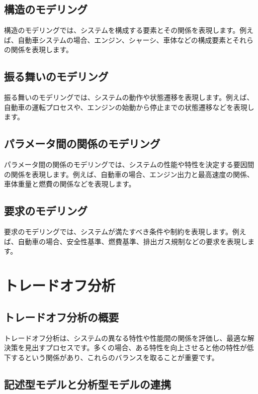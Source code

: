 \subsection{構造のモデリング}

構造のモデリングでは、システムを構成する要素とその関係を表現します。例えば、自動車システムの場合、エンジン、シャーシ、車体などの構成要素とそれらの関係を表現します。

\subsection{振る舞いのモデリング}

振る舞いのモデリングでは、システムの動作や状態遷移を表現します。例えば、自動車の運転プロセスや、エンジンの始動から停止までの状態遷移などを表現します。

\subsection{パラメータ間の関係のモデリング}

パラメータ間の関係のモデリングでは、システムの性能や特性を決定する要因間の関係を表現します。例えば、自動車の場合、エンジン出力と最高速度の関係、車体重量と燃費の関係などを表現します。

\subsection{要求のモデリング}

要求のモデリングでは、システムが満たすべき条件や制約を表現します。例えば、自動車の場合、安全性基準、燃費基準、排出ガス規制などの要求を表現します。

\section{トレードオフ分析}

\subsection{トレードオフ分析の概要}

トレードオフ分析は、システムの異なる特性や性能間の関係を評価し、最適な解決策を見出すプロセスです。多くの場合、ある特性を向上させると他の特性が低下するという関係があり、これらのバランスを取ることが重要です。

\subsection{記述型モデルと分析型モデルの連携}

